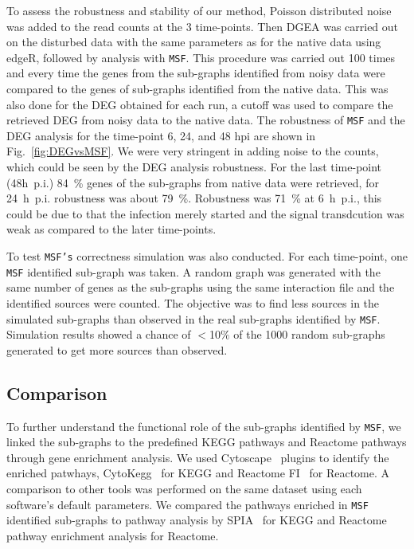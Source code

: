 \documentclass[10pt,a4paper,twocolumn]{article}
\begin{document}
 To assess the robustness and stability of our method, Poisson
 distributed noise was added to the read counts at the 3 time-points. Then DGEA was
 carried out on the disturbed data with the same parameters as for the
 native data using edgeR, followed by analysis with \texttt{MSF}. This procedure was carried out 100 times
 and every time the genes from the sub-graphs identified from noisy
 data were compared to the genes of sub-graphs identified from the
 native data. This was also done for the DEG obtained for each run, a
 cutoff was used to compare the retrieved DEG from noisy data to the
 native data.  The robustness of \texttt{MSF} and the DEG analysis for
 the time-point 6, 24, and 48 hpi are shown in Fig.~\ref{fig:DEGvsMSF}. We were very stringent in
 adding noise to the counts, which could be seen by the DEG analysis
 robustness. For the last time-point (48h~p.i.) 84~\% genes of the
 sub-graphs from native data were retrieved, for 24~h~p.i. robustness was
 about 79~\%. Robustness was 71~\% at 6~h~p.i., this could be due to that the
 infection merely started and the signal transdcution was weak as
 compared to the later time-points.
 
 To test \texttt{MSF's} correctness simulation was also conducted. For each time-point, one \texttt{MSF} identified sub-graph was taken. A random graph was generated with the same number of genes as the sub-graphs using the same interaction file and the identified sources were counted. The objective
 was to find less sources in the simulated sub-graphs than observed in the real sub-graphs identified by
 \texttt{MSF}. Simulation results showed a chance of $<$10$\%$
 of the 1000 random sub-graphs generated to get more sources than observed.



\subsection*{Comparison}

To further understand the functional role of the sub-graphs identified
by \texttt{MSF}, we linked the sub-graphs to the predefined KEGG
pathways and Reactome pathways through gene enrichment analysis. We
used Cytoscape~\cite{Cyto} plugins to identify the enriched patwhays,
CytoKegg~\cite{Cytokegg} for KEGG and Reactome FI~\cite{Reactome} for
Reactome. A comparison to other tools was performed on the same dataset using each software's default parameters. We compared the pathways enriched in \texttt{MSF} identified
sub-graphs to pathway analysis by SPIA~\cite{Tarca} for KEGG and
Reactome pathway enrichment analysis for Reactome.
\end{document}
